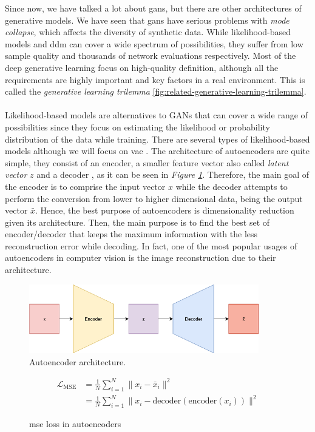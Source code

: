 \documentclass[../main.tex]{subfiles}
\begin{document}
Since now, we have talked a lot about \gls{gan}s, but there are other architectures of generative models. We have seen that \gls{gan}s have serious problems with \textit{mode collapse}, which affects the diversity of synthetic data. While likelihood-based models and \gls{ddm} can cover a wide spectrum of possibilities, they suffer from low sample quality and thousands of network evaluations respectively. Most of the deep generative learning focus on high-quality definition, although all the requirements are highly important and key factors in a real environment. This is called the \textit{generative learning trilemma} \ref{fig:related-generative-learning-trilemma}.
\\\\
Likelihood-based models are alternatives to GANs that can cover a wide range of possibilities since they focus on estimating the likelihood or probability distribution of the data while training. There are several types of likelihood-based models although we will focus on \gls{vae} \cite{vae-intro}. The architecture of autoencoders are quite simple, they consist of an encoder, a smaller feature vector also called \textit{latent vector} $z$ and a decoder , as it can be seen in \textit{Figure \ref{fig:related-autoencoder}}. Therefore, the main goal of the encoder is to comprise the input vector $x$ while the decoder attempts to perform the conversion from lower to higher dimensional data, being the output vector $\bar{x}$. Hence, the best purpose of autoencoders is dimensionality reduction given its architecture. Then, the main purpose is to find the best set of encoder/decoder that keeps the maximum information with the less reconstruction error while decoding. In fact, one of the most popular usages of autoencoders in computer vision is the image reconstruction due to their architecture.
\begin{figure}[H]
	\centering
	\includegraphics[width=10cm]{imgs/relatedwork/autoencoder}
	\caption{Autoencoder architecture.}
	\label{fig:related-autoencoder}
\end{figure}
\begin{figure}[H]
	\begin{align*}
		\mathcal{L}_{\text{MSE}} &= \frac{1}{N} \sum_{i=1}^{N} \| x_i - \bar{x}_i \|^2\\
		&= \frac{1}{N} \sum_{i=1}^{N} \| x_i - \text{decoder}(\text{encoder}(x_i)) \|^2
	\end{align*}
	\caption{\gls{mse} loss in autoencoders}
\end{figure}
\end{document}
